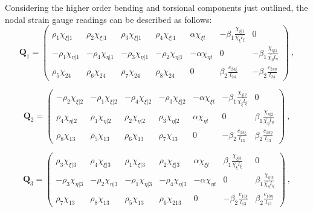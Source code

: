 Considering the higher order bending and torsional components just outlined, the nodal strain gauge readings can be described as follows:
\begin{equation} 
\mathbf{Q}_1 =
\begin{pmatrix}
\rho_1 \chi_{\xi | 1} & \rho_2 \chi_{\xi | 1} & \rho_3 \chi_{\xi | 1} & \rho_4 \chi_{\xi | 1} & \alpha \chi_{\xi t} & -\beta_1 \frac{\chi_{\xi | 1}}{\bar{\chi_\xi} l_\xi} & 0  \\	
-\rho_1 \chi_{\eta | 1} & -\rho_4 \chi_{\eta | 1} & -\rho_3 \chi_{\eta | 1} & -\rho_2 \chi_{\eta | 1} & -\alpha \chi_{\eta t} & 0 & -\beta_1 \frac{\chi_{\eta | 1}}{\bar{\chi_\eta} l_\eta} \\
\rho_5 \chi_{24} & \rho_6 \chi_{24} & \rho_7 \chi_{24} & \rho_8 \chi_{24} & 0 & \beta_2 \frac{c_{24 \xi}}{l_{24}} & -\beta_2 \frac{c_{24 \eta}}{l_{24}}
\end{pmatrix}		
\label{equation14}\ ,
\end{equation}

\begin{equation} 
\mathbf{Q}_2 =
\begin{pmatrix}
-\rho_2 \chi_{\xi | 2} & -\rho_1 \chi_{\xi | 2} & -\rho_4 \chi_{\xi | 2} & -\rho_3 \chi_{\xi | 2} & -\alpha \chi_{\xi t} & -\beta_1 \frac{\chi_{\xi | 2}}{\bar{\chi_\xi} l_\xi} & 0  \\	
\rho_4 \chi_{\eta | 2} & \rho_1 \chi_{\eta | 2} & \rho_2 \chi_{\eta | 2} & \rho_3 \chi_{\eta | 2} & \alpha \chi_{\eta t} & 0 & \beta_1 \frac{\chi_{\eta | 2}}{\bar{\chi_\eta} l_\eta} \\
\rho_8 \chi_{13} & \rho_5 \chi_{13} & \rho_6 \chi_{13} & \rho_7 \chi_{13} & 0 & -\beta_2 \frac{c_{13 \xi}}{l_{13}} & \beta_2 \frac{c_{13 \eta}}{l_{13}}
\end{pmatrix}		
\label{equation14_2}\ ,
\end{equation}

\begin{equation} 
\mathbf{Q}_3 =
\begin{pmatrix}
\rho_3 \chi_{\xi | 3} & \rho_4 \chi_{\xi | 3} & \rho_1 \chi_{\xi | 3} & \rho_2 \chi_{\xi | 3} & \alpha \chi_{\xi t} & \beta_1 \frac{\chi_{\xi | 3}}{\bar{\chi_\xi} l_\xi} & 0  \\	
-\rho_3 \chi_{\eta | 3} & -\rho_2 \chi_{\eta | 3} & -\rho_1 \chi_{\eta | 3} & -\rho_4 \chi_{\eta | 3} & -\alpha \chi_{\eta t} & 0 & \beta_1 \frac{\chi_{\eta | 3}}{\bar{\chi_\eta} l_\eta} \\
\rho_7 \chi_{13} & \rho_8 \chi_{13} & \rho_5 \chi_{13} & \rho_6 \chi_{213} & 0 & -\beta_2 \frac{c_{13 \xi}}{l_{13}} & \beta_2 \frac{c_{13 \eta}}{l_{13}}
\end{pmatrix}		
\label{equation14_3}\ ,
\end{equation}

